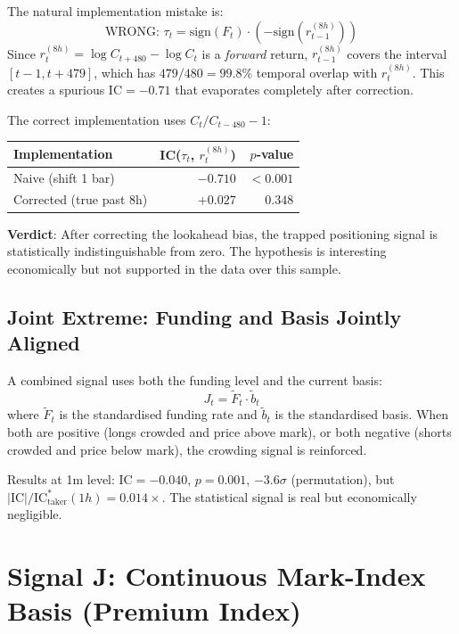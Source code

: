 \documentclass[12pt, a4paper]{article}
\theoremstyle{definition}
\newcommand{\IC}{\mathrm{IC}}
\newcommand{\sign}{\mathrm{sign}}
\begin{document}
The natural implementation mistake is:
\[
  \text{WRONG: } \tau_t = \sign(F_t) \cdot (-\sign(r_{t-1}^{(8h)}))
\]
Since $r_t^{(8h)} = \log C_{t+480} - \log C_t$ is a \emph{forward} return,
$r_{t-1}^{(8h)}$ covers the interval $[t-1, t+479]$, which has
$479/480 = 99.8\%$ temporal overlap with $r_t^{(8h)}$. This creates a
spurious $\IC = -0.71$ that evaporates completely after correction.

The correct implementation uses $C_t/C_{t-480} - 1$:
\begin{center}
\begin{tabular}{lrr}
\toprule
Implementation & IC($\tau_t$, $r_t^{(8h)}$) & $p$-value \\
\midrule
Naive (shift 1 bar) & $-0.710$ & $< 0.001$ \\
Corrected (true past 8h) & $+0.027$ & $0.348$ \\
\bottomrule
\end{tabular}
\end{center}

\textbf{Verdict}: After correcting the lookahead bias, the trapped positioning
signal is statistically indistinguishable from zero. The hypothesis is
interesting economically but not supported in the data over this sample.

\subsection{Joint Extreme: Funding and Basis Jointly Aligned}

A combined signal uses both the funding level and the current basis:
\[
  J_t = \tilde{F}_t \cdot \tilde{b}_t
\]
where $\tilde{F}_t$ is the standardised funding rate and $\tilde{b}_t$ is
the standardised basis. When both are positive (longs crowded and price
above mark), or both negative (shorts crowded and price below mark), the
crowding signal is reinforced.

Results at 1m level: $\IC = -0.040$, $p = 0.001$, $-3.6\sigma$ (permutation),
but $|\IC|/\IC^*_{\text{taker}}(1h) = 0.014\times$. The statistical signal
is real but economically negligible.


\section{Signal J: Continuous Mark-Index Basis (Premium Index)}
\label{sec:premium}
\end{document}
